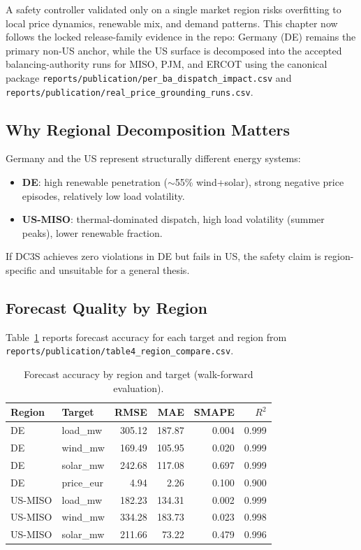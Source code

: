A safety controller validated only on a single market region risks
overfitting to local price dynamics, renewable mix, and demand patterns.
This chapter now follows the locked release-family evidence in the repo:
Germany (DE) remains the primary non-US anchor, while the US surface is
decomposed into the accepted balancing-authority runs for MISO, PJM, and
ERCOT using the canonical package
\texttt{reports/publication/per\_ba\_dispatch\_impact.csv} and
\texttt{reports/publication/real\_price\_grounding\_runs.csv}.

\subsection{Why Regional Decomposition Matters}

Germany and the US represent structurally different energy systems:

\begin{itemize}
  \item \textbf{DE}: high renewable penetration ($\sim$55\% wind+solar),
    strong negative price episodes, relatively low load volatility.
  \item \textbf{US-MISO}: thermal-dominated dispatch, high load
    volatility (summer peaks), lower renewable fraction.
\end{itemize}

If DC3S achieves zero violations in DE but fails in US, the safety
claim is region-specific and unsuitable for a general thesis.

\subsection{Forecast Quality by Region}

Table~\ref{tab:region-forecast} reports forecast accuracy for each
target and region from \texttt{reports/publication/table4\_region\_compare.csv}.

\begin{table}[ht]
\centering
\caption{Forecast accuracy by region and target (walk-forward evaluation).}
\label{tab:region-forecast}
\begin{tabular}{llrrrr}
\toprule
\textbf{Region} & \textbf{Target} & \textbf{RMSE} & \textbf{MAE} &
  \textbf{SMAPE} & \textbf{$R^2$} \\
\midrule
DE      & load\_mw    & 305.12 & 187.87 & 0.004 & 0.999 \\
DE      & wind\_mw    & 169.49 & 105.95 & 0.020 & 0.999 \\
DE      & solar\_mw   & 242.68 & 117.08 & 0.697 & 0.999 \\
DE      & price\_eur  &   4.94 &   2.26 & 0.100 & 0.900 \\
\midrule
US-MISO & load\_mw    & 182.23 & 134.31 & 0.002 & 0.999 \\
US-MISO & wind\_mw    & 334.28 & 183.73 & 0.023 & 0.998 \\
US-MISO & solar\_mw   & 211.66 &  73.22 & 0.479 & 0.996 \\
\bottomrule
\end{tabular}
\end{table}

